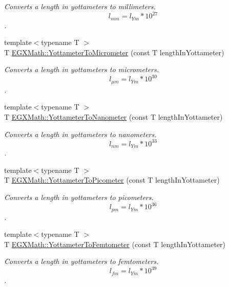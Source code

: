 \begin{DoxyCompactItemize}
\begin{DoxyCompactList}\small\item\em Converts a length in yottameters to millimeters. \[ l_{mm}=l_{Ym} * 10^{27} \]. \end{DoxyCompactList}\item 
{\footnotesize template$<$typename T $>$ }\\T \mbox{\hyperlink{group___e_g_x_math-_conversions-_length_conversions-_yottameter-_s_i_ga25310d8ba2830f305680927ac3c13c38}{E\+G\+X\+Math\+::\+Yottameter\+To\+Micrometer}} (const T length\+In\+Yottameter)
\begin{DoxyCompactList}\small\item\em Converts a length in yottameters to micrometers. \[ l_{\mu m}=l_{Ym} * 10^{30} \]. \end{DoxyCompactList}\item 
{\footnotesize template$<$typename T $>$ }\\T \mbox{\hyperlink{group___e_g_x_math-_conversions-_length_conversions-_yottameter-_s_i_ga9e117a640ecd0bea911edac05c685c31}{E\+G\+X\+Math\+::\+Yottameter\+To\+Nanometer}} (const T length\+In\+Yottameter)
\begin{DoxyCompactList}\small\item\em Converts a length in yottameters to nanometers. \[ l_{nm}=l_{Ym} * 10^{33} \]. \end{DoxyCompactList}\item 
{\footnotesize template$<$typename T $>$ }\\T \mbox{\hyperlink{group___e_g_x_math-_conversions-_length_conversions-_yottameter-_s_i_ga7af9d1314de06921546f079641c033b2}{E\+G\+X\+Math\+::\+Yottameter\+To\+Picometer}} (const T length\+In\+Yottameter)
\begin{DoxyCompactList}\small\item\em Converts a length in yottameters to picometers. \[ l_{pm}=l_{Ym} * 10^{36} \]. \end{DoxyCompactList}\item 
{\footnotesize template$<$typename T $>$ }\\T \mbox{\hyperlink{group___e_g_x_math-_conversions-_length_conversions-_yottameter-_s_i_ga02dbecce4d520a89139e6de0e2fec6d9}{E\+G\+X\+Math\+::\+Yottameter\+To\+Femtometer}} (const T length\+In\+Yottameter)
\begin{DoxyCompactList}\small\item\em Converts a length in yottameters to femtometers. \[ l_{fm}=l_{Ym} * 10^{39} \]. \end{DoxyCompactList}\item 

\end{DoxyCompactItemize}
